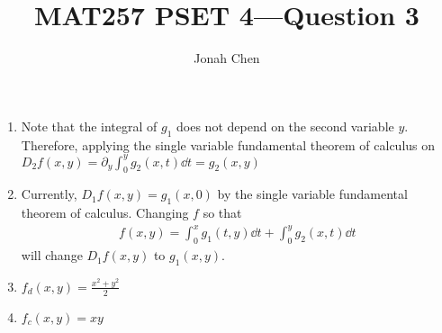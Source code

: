\documentclass{exam}
\title{MAT257 PSET 4---Question 3}
\author{Jonah Chen}
\numberwithin{equation}{section}
\begin{document}
    \sffamily
    \maketitle
    \begin{enumerate}[label=(\alph*)]
        \item Note that the integral of $g_1$ does not depend on the second variable $y$. Therefore, applying the single variable fundamental theorem of calculus on $D_2f(x,y)=\partial_y\int_0^yg_2(x,t)\dd t=g_2(x,y)$
        \item Currently, $D_1f(x,y)=g_1(x,0)$ by the single variable fundamental theorem of calculus. Changing $f$ so that 
        \begin{align*}
            f(x,y)=\int_0^xg_1(t,y)\dd t+\int_0^yg_2(x,t)\dd t
        \end{align*}
        will change $D_1f(x,y)$ to $g_1(x,y)$.
        \item $f_d(x,y)=\frac{x^2+y^2}{2}$
        \item $f_c(x,y)=xy$
    \end{enumerate}
\end{document}
